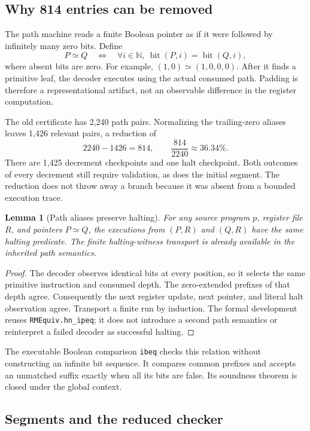 \documentclass[11pt]{article}
\newtheorem{lemma}[theorem]{Lemma}
\theoremstyle{definition}\newtheorem{definition}[theorem]{Definition}
\begin{document}
\subsection{Why 814 entries can be removed}

The path machine reads a finite Boolean pointer as if it were followed by
infinitely many zero bits. Define
\[
 P\simeq Q\quad\Longleftrightarrow\quad
 \forall i\in\mathbb N,\ \operatorname{bit}(P,i)=\operatorname{bit}(Q,i),
\]
where absent bits are zero. For example, \((1,0)\simeq(1,0,0,0)\).
After it finds a primitive leaf, the decoder executes using the actual
consumed path. Padding is therefore a representational artifact, not an
observable difference in the register computation.

The old certificate has 2,240 path pairs. Normalizing the trailing-zero aliases
leaves 1,426 relevant pairs, a reduction of
\[
  2240-1426=814,\qquad \frac{814}{2240}\approx 36.34\%.
\]
There are 1,425 decrement checkpoints and one halt checkpoint. Both outcomes
of every decrement still require validation, as does the initial segment.
The reduction does not throw away a branch because it was absent from a
bounded execution trace.

\begin{lemma}[Path aliases preserve halting]
For any source program $p$, register file $R$, and pointers $P\simeq Q$,
the executions from $(P,R)$ and $(Q,R)$ have the same halting predicate.
The finite halting-witness transport is already available in the inherited
path semantics.
\end{lemma}

\begin{proof}
The decoder observes identical bits at every position, so it selects the same
primitive instruction and consumed depth. The zero-extended prefixes of that
depth agree. Consequently the next register update, next pointer, and literal
halt observation agree. Transport a finite run by induction. The formal
development reuses \texttt{RMEquiv.hn\_ipeq}; it does not introduce a second
path semantics or reinterpret a failed decoder as successful halting.
\end{proof}

The executable Boolean comparison \texttt{ibeq} checks this relation without
constructing an infinite bit sequence. It compares common prefixes and accepts
an unmatched suffix exactly when all its bits are false. Its soundness theorem
is closed under the global context.

\subsection{Segments and the reduced checker}
\end{document}
